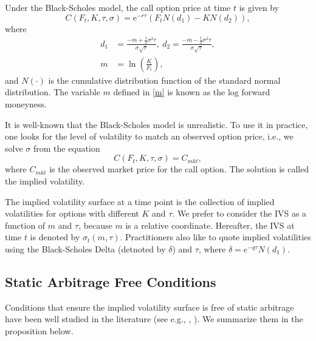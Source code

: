 \documentclass[11pt,a4paper]{article}
\theoremstyle{remark}
\begin{document}
Under the Black-Scholes model, the call option price at time $t$ is given by
\begin{equation}
	C\left(F_{t}, K, \tau, \sigma\right)=\mathrm{e}^{-r \tau}\left(F_{t} N\left(d_{1}\right)-K N\left(d_{2}\right)\right),
\end{equation}
where 
\begin{align} 
	d_{1}&=\frac{-m+\frac{1}{2} \sigma^{2} \tau}{\sigma\sqrt{\tau}},\ d_{2}=\frac{-m-\frac{1}{2} \sigma^{2} \tau}{\sigma\sqrt{\tau}},  \label{d}\\
    m &= \ln \left(\frac{K}{F_{t}}\right),  \label{m}
\end{align}
and $N(\cdot)$ is the cumulative distribution function of the standard normal distribution. The variable $m$ defined in \eqref{m} is known as the log forward moneyness.

It is well-known that the Black-Scholes model is unrealistic. To use it in practice, one looks for the level of volatility to match an observed option price, i.e., we solve $\sigma$ from the equation
\begin{equation}
	C\left(F_{t}, K, \tau, \sigma\right)=C_{mkt}, 
\end{equation}
where $C_{mkt}$ is the observed market price for the call option. The solution is called the implied volatility. 

The implied volatility surface at a time point is the collection of implied volatilities for options with different $K$ and $\tau$.  We prefer to consider the IVS as a function of $m$ and $\tau$, because $m$ is a relative coordinate. Hereafter, the IVS at time $t$ is denoted by $\sigma_t(m,\tau)$. Practitioners also like to quote implied volatilities using the Black-Scholes Delta (detnoted by $\delta$) and $\tau$, where 
$\delta=e^{-q\tau}N(d_1)$.

\subsection{Static Arbitrage Free Conditions}
Conditions that ensure the implied volatility surface is free of static arbitrage have been well studied in the literature (see e.g., \cite{roper2010arbitrage}, \cite{gulisashvili2012analytically}). We summarize them in the proposition below. 
\end{document}

